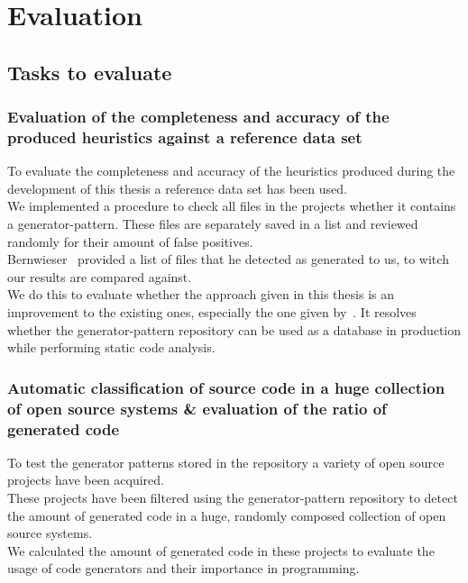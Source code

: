 
\chapter{Evaluation}\label{chapter:evaluation}
\section{Tasks to evaluate}

\subsection{Evaluation of the completeness and accuracy of the produced heuristics against a reference data set}
To evaluate the completeness and accuracy of the heuristics produced during the development of this thesis a reference data set has been used.\\
We implemented a procedure to check all files in the projects whether it contains a generator-pattern. These files are separately saved in a list and reviewed randomly for their amount of false positives. \\
Bernwieser~\cite{Bernwieser2014} provided a list of files that he detected as generated to us, to witch our results are compared against. \\
We do this to evaluate whether the approach given in this thesis is an improvement to the existing ones, especially the one given by~\cite{Bernwieser2014}. It resolves whether the generator-pattern repository can be used as a database in production while performing static code analysis.

\subsection{Automatic classification of source code in a huge collection of open source systems \& evaluation of the ratio of generated code}
To test the generator patterns stored in the repository a variety of open source projects have been acquired.\\
These projects have been filtered using the generator-pattern repository to detect the amount of generated code in a huge, randomly composed collection of open source systems.\\
We calculated the amount of generated code in these projects to evaluate the usage of code generators and their importance in programming. 

